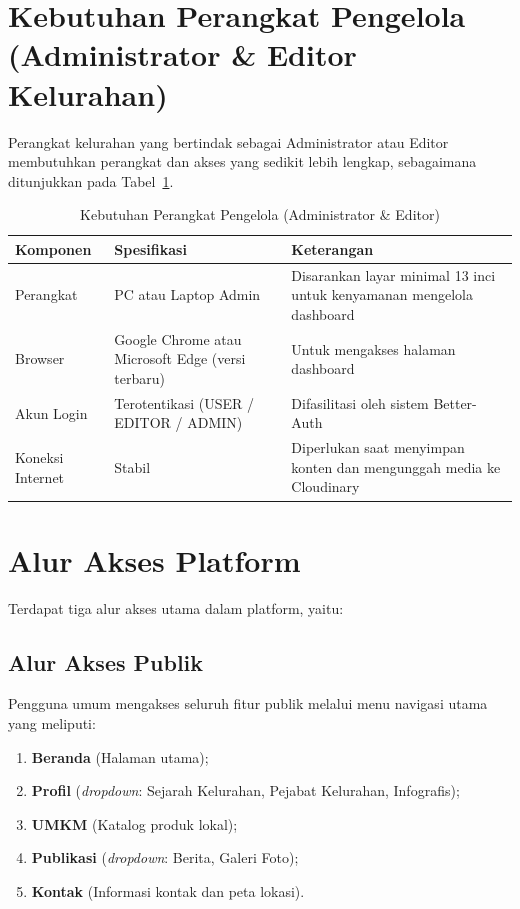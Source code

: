 \documentclass[12pt,a4paper]{report}
\begin{document}
\section{Kebutuhan Perangkat Pengelola (Administrator \& Editor Kelurahan)}

Perangkat kelurahan yang bertindak sebagai Administrator atau Editor membutuhkan perangkat dan akses yang sedikit lebih lengkap, sebagaimana ditunjukkan pada Tabel~\ref{tab:req-admin}.

\begin{table}[H]
    \centering
    \caption{Kebutuhan Perangkat Pengelola (Administrator \& Editor)}
    \label{tab:req-admin}
    \begin{tabularx}{\textwidth}{llX}
        \toprule
        \textbf{Komponen} & \textbf{Spesifikasi} & \textbf{Keterangan} \\
        \midrule
        Perangkat & PC atau Laptop Admin & Disarankan layar minimal 13 inci untuk kenyamanan mengelola dashboard \\
        Browser & Google Chrome atau Microsoft Edge (versi terbaru) & Untuk mengakses halaman dashboard \\
        Akun Login & Terotentikasi (USER / EDITOR / ADMIN) & Difasilitasi oleh sistem Better-Auth \\
        Koneksi Internet & Stabil & Diperlukan saat menyimpan konten dan mengunggah media ke Cloudinary \\
        \bottomrule
    \end{tabularx}
\end{table}

\section{Alur Akses Platform}

Terdapat tiga alur akses utama dalam platform, yaitu:

\subsection{Alur Akses Publik}

Pengguna umum mengakses seluruh fitur publik melalui menu navigasi utama yang meliputi:
\begin{enumerate}[leftmargin=2em, itemsep=2pt]
    \item \textbf{Beranda} (Halaman utama);
    \item \textbf{Profil} (\emph{dropdown}: Sejarah Kelurahan, Pejabat Kelurahan, Infografis);
    \item \textbf{UMKM} (Katalog produk lokal);
    \item \textbf{Publikasi} (\emph{dropdown}: Berita, Galeri Foto);
    \item \textbf{Kontak} (Informasi kontak dan peta lokasi).
\end{enumerate}
\end{document}
